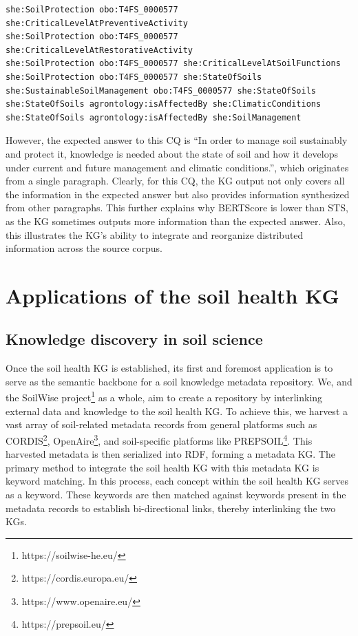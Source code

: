 \documentclass[preprint,12pt]{elsarticle}
\begin{document}
\begin{lstlisting}[style=TurtleStyle, caption={Query result, \texttt{obo:T4FS\_0000577} represents ``requires knowledge about''}, label={lst1_6}]
she:SoilProtection obo:T4FS_0000577 she:CriticalLevelAtPreventiveActivity
she:SoilProtection obo:T4FS_0000577 she:CriticalLevelAtRestorativeActivity
she:SoilProtection obo:T4FS_0000577 she:CriticalLevelAtSoilFunctions
she:SoilProtection obo:T4FS_0000577 she:StateOfSoils
she:SustainableSoilManagement obo:T4FS_0000577 she:StateOfSoils
she:StateOfSoils agrontology:isAffectedBy she:ClimaticConditions
she:StateOfSoils agrontology:isAffectedBy she:SoilManagement
\end{lstlisting}
However, the expected answer to this CQ is ``In order to manage soil sustainably and protect it, knowledge is needed about the state of soil and how it develops under current and future management and climatic conditions.'', which originates from a single paragraph.
Clearly, for this CQ, the KG output not only covers all the information in the expected answer but also provides information synthesized from other paragraphs. This further explains why BERTScore is lower than STS, as the KG sometimes outputs more information than the expected answer. Also, this illustrates the KG’s ability to integrate and reorganize distributed information across the source corpus.

\section{Applications of the soil health KG}\label{sec6}
\subsection{Knowledge discovery in soil science} \label{sec6_1}
Once the soil health KG is established, its first and foremost application is to serve as the semantic backbone for a soil knowledge metadata repository.  We, and the SoilWise project\footnote{https://soilwise-he.eu/} as a whole, aim to create a repository by interlinking external data and knowledge to the soil health KG. To achieve this, we harvest a vast array of soil-related metadata records from general platforms such as CORDIS\footnote{https://cordis.europa.eu/}, OpenAire\footnote{https://www.openaire.eu/}, and soil-specific platforms like PREPSOIL\footnote{https://prepsoil.eu/}. This harvested metadata is then serialized into RDF, forming a metadata KG. The primary method to integrate the soil health KG with this metadata KG is keyword matching. In this process, each concept within the soil health KG serves as a keyword. These keywords are then matched against keywords present in the metadata records to establish bi-directional links, thereby interlinking the two KGs.
\end{document}
